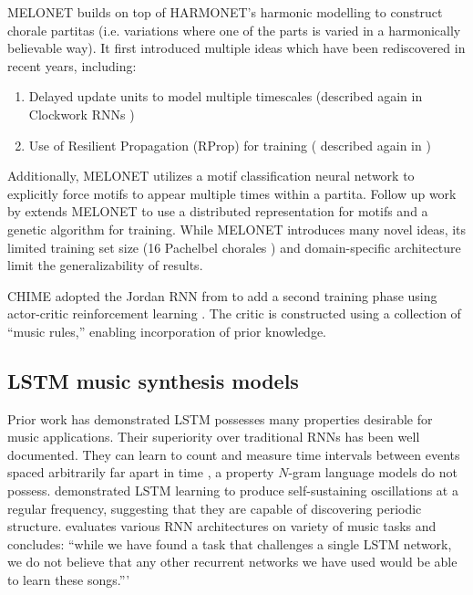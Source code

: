 MELONET \citep{feulner1994melonet} builds on top of HARMONET's harmonic
modelling to construct chorale partitas (i.e. variations where one of the
parts is varied in a harmonically believable way). It first introduced multiple
ideas which have been rediscovered in recent years, including:
\begin{enumerate}
  \item Delayed update units to model multiple timescales (described again in Clockwork
  RNNs \citep{Koutnik2014})
  \item Use of Resilient Propagation (RProp) \citep{riedmiller1993direct} for training (
  described again in \citet{Liu2014})
\end{enumerate}
Additionally, MELONET utilizes a motif classification neural network to
explicitly force motifs to appear multiple times within a partita.
Follow up work by \citet{hornel1996learning} extends MELONET to use a distributed
representation for motifs and a genetic algorithm for training.
While MELONET introduces many novel ideas, its limited training set size
(16 Pachelbel chorales \citep{hornel1997melonet}) and domain-specific
architecture limit the generalizability of results. 

CHIME \citep{franklin2001learning} adopted the Jordan RNN from
\citet{todd1989connectionist} to add a second training phase using actor-critic
reinforcement learning \citep{sutton1998reinforcement}. The critic is
constructed using a collection of ``music rules,'' enabling incorporation of
prior knowledge.

\subsection{LSTM music synthesis models}

Prior work has demonstrated LSTM possesses many properties desirable for music
applications. Their superiority over traditional RNNs has been well
documented\citep{gers2001lstm}. They can learn to count and measure time
intervals between events spaced arbitrarily far apart in time
\citep{gers2000recurrent}, a property $N$-gram language models do not possess.
\citet{gers2002learning} demonstrated LSTM learning to produce self-sustaining
oscillations at a regular frequency, suggesting that they are capable of
discovering periodic structure. \citet{franklin2006recurrent} evaluates various
RNN architectures on variety of music tasks and concludes: ``while we have
found a task that challenges a single LSTM network, we do not believe that any
other recurrent networks we have used would be able to learn these songs.'''

